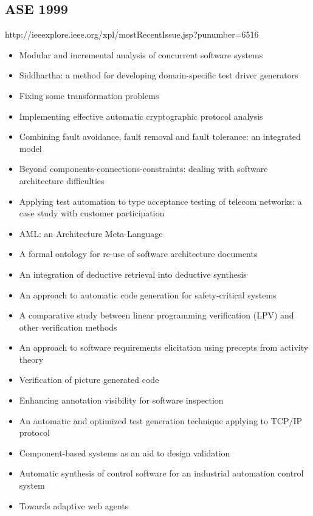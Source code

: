 \subsection{ASE 1999}

http://ieeexplore.ieee.org/xpl/mostRecentIssue.jsp?punumber=6516

{\small
\begin{itemize}[itemsep=-1ex]
  \item Modular and incremental analysis of concurrent software systems
  \item Siddhartha: a method for developing domain-specific test driver generators
  \item Fixing some transformation problems
  \item Implementing effective automatic cryptographic protocol analysis
  \item Combining fault avoidance, fault removal and fault tolerance: an integrated model
  \item Beyond components-connections-constraints: dealing with software architecture difficulties
  \item Applying test automation to type acceptance testing of telecom networks: a case study with customer participation
  \item AML: an Architecture Meta-Language
  \item A formal ontology for re-use of software architecture documents
  \item An integration of deductive retrieval into deductive synthesis
  \item An approach to automatic code generation for safety-critical systems
  \item A comparative study between linear programming verification (LPV) and other verification methods
  \item An approach to software requirements elicitation using precepts from activity theory
  \item Verification of picture generated code
  \item Enhancing annotation visibility for software inspection
  \item An automatic and optimized test generation technique applying to TCP/IP protocol
  \item Component-based systems as an aid to design validation
  \item Automatic synthesis of control software for an industrial automation control system
  \item Towards adaptive web agents

\end{itemize}}
